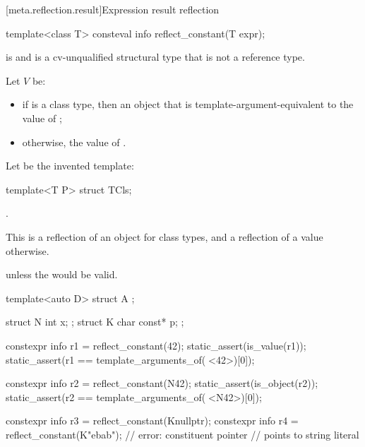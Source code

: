 [meta.reflection.result]{Expression result reflection}

%
\begin{itemdecl}
template<class T>
  consteval info reflect_constant(T expr);
\end{itemdecl}

\begin{itemdescr}
\pnum
\mandates
{} is 
and  is a cv-unqualified structural type
that is not a reference type.

\pnum
Let $V$ be:
\begin{itemize}
\item
  if  is a class type,
  then an object that is template-argument-equivalent to the value of ;
\item
  otherwise, the value of .
\end{itemize}

\pnum
Let  be the invented template:
\begin{codeblock}
template<T P> struct TCls;
\end{codeblock}

\pnum
\returns
{}.
\begin{note}
This is a reflection of an object for class types,
and a reflection of a value otherwise.
\end{note}

\pnum
\throws
{} unless
the   would be valid.

\pnum
\begin{example}
\begin{codeblock}
template<auto D>
  struct A { };

struct N { int x; };
struct K { char const* p; };

constexpr info r1 = reflect_constant(42);
static_assert(is_value(r1));
static_assert(r1 == template_arguments_of(^^A<42>)[0]);

constexpr info r2 = reflect_constant(N{42});
static_assert(is_object(r2));
static_assert(r2 == template_arguments_of(^^A<N{42}>)[0]);

constexpr info r3 = reflect_constant(K{nullptr});
constexpr info r4 = reflect_constant(K{"ebab"});        // error: constituent pointer
                                                        // points to string literal
\end{codeblock}
\end{example}
\end{itemdescr}

